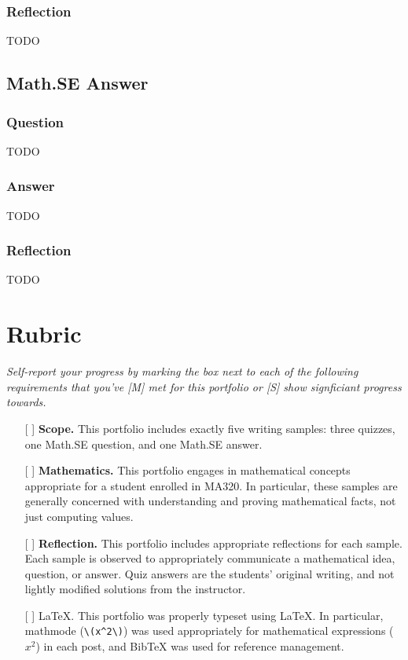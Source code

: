 \documentclass{article}
\begin{document}
\subsubsection*{Reflection}
TODO




\subsection{Math.SE Answer}
\subsubsection*{Question}
TODO

\subsubsection*{Answer}
TODO \cite{1089984}

\subsubsection*{Reflection}
TODO





\section{Rubric}
\textit{Self-report your progress by marking the box next to
each of the following requirements that you've [M] met
for this portfolio or [S] show signficiant progress towards.}

\begin{itemize}
\item[[ ]] \textbf{Scope.} This portfolio includes exactly
five writing samples: three quizzes, one Math.SE question,
and one Math.SE answer.
\item[[ ]] \textbf{Mathematics.} This portfolio engages in
mathematical concepts appropriate for a student enrolled in
MA320. In particular, these samples are generally concerned
with understanding and proving mathematical facts, not just
computing values.
\item[[ ]] \textbf{Reflection.} This portfolio includes
appropriate reflections for each sample. Each sample is observed
to appropriately communicate a mathematical idea, question, or answer.
Quiz answers are the students' original writing, and not lightly
modified solutions from the instructor.
\item[[ ]] \LaTeX{}. This portfolio was properly typeset
using \LaTeX{}. In particular, mathmode (\verb|\(x^2\)|) was
used appropriately for mathematical expressions (\(x^2\))
in each post, and BibTeX \cite{bibtexDocs}
was used for reference management.
\end{itemize}
\end{document}
